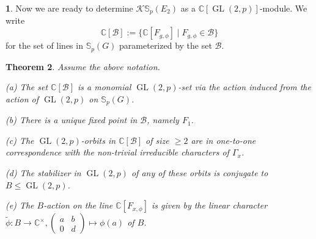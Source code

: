 \documentclass[12pt]{article}
\theoremstyle{plain}
\newtheorem{theorem}{Theorem}[section]
\theoremstyle{definition}
\newtheorem{nothing}[theorem]{}
\newcommand{\kerlin}{\mathbb S_p}
\newcommand{\gl}{{\operatorname{GL}(2, p)}}
\begin{document}
\begin{nothing}
Now we are ready to determine $\mathcal{K}\kerlin(E_2)$ as a $\mathbb C[\gl]$-module. We write
\[
\mathbb C[\mathcal B]:= \{ \mathbb C[F_{g, \phi}]\mid F_{g, \phi}\in \mathcal B\}
\]
for the set of lines in $\kerlin(G)$ parameterized by the set $\mathcal{B}$.
\end{nothing}
\begin{theorem}\label{thm:cpcpfinal}
    Assume the above notation.

    {\rm (a)} The set $\mathbb C[\mathcal{B}]$ is a monomial $\gl$-set via the action induced from the action of $\gl$ on $\kerlin(G)$.

    \smallskip
    {\rm (b)} There is a unique fixed point in $\mathcal B$, namely $F_1$.
    
    \smallskip
    {\rm (c)} The $\gl$-orbits in $\mathbb C[\mathcal B]$ of size $\ge 2$ are in one-to-one correspondence with the non-trivial irreducible characters of $\Gamma_x$.
    
    \smallskip
    {\rm (d)} The stabilizer in $\gl$ of any of these orbits is conjugate to $B\le\gl$.
    
    \smallskip
    {\rm (e)} The $B$-action on the line $\mathbb C[F_{x, \phi}]$ is given by the linear character $\tilde\phi: B\to \mathbb C^\times, \begin{pmatrix}
        a & b\\ 0 & d
    \end{pmatrix}\mapsto \phi(a)$ of $B$. 
\end{theorem}
\end{document}
